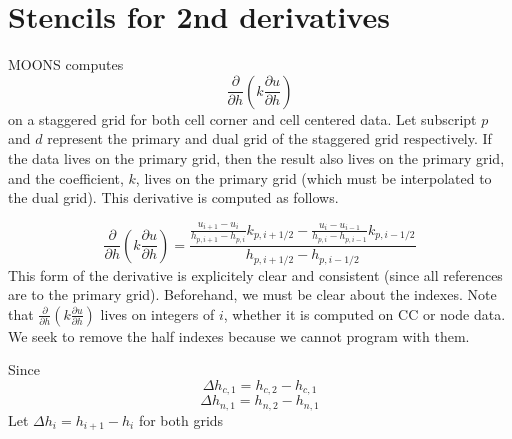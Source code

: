 \documentclass[11pt]{article}
\begin{document}
\section{Stencils for 2nd derivatives}
MOONS computes
\begin{equation}
\frac{\partial}{\partial h} \left( k \frac{\partial u}{\partial h} \right)
\end{equation}
on a staggered grid for both cell corner and cell centered data. Let subscript $p$ and $d$ represent the primary and dual grid of the staggered grid respectively. If the data lives on the primary grid, then the result also lives on the primary grid, and the coefficient, $k$, lives on the primary grid (which must be interpolated to the dual grid). This derivative is computed as follows.

\begin{equation}
\frac{\partial}{\partial h} \left( k \frac{\partial u}{\partial h} \right)
 = \frac{\frac{u_{i+1}-u_{i}}{h_{p,i+1}-h_{p,i}} k_{p,i+1/2} - \frac{u_{i}-u_{i-1}}{h_{p,i}-h_{p,i-1}} k_{p,i-1/2}}{h_{p,i+1/2} - h_{p,i-1/2}}
\end{equation}
This form of the derivative is explicitely clear and consistent (since all references are to the primary grid). Beforehand, we must be clear about the indexes. Note that $\frac{\partial}{\partial h} \left( k \frac{\partial u}{\partial h} \right)$ lives on integers of $i$, whether it is computed on CC or node data. We seek to remove the half indexes because we cannot program with them.

Since
\begin{equation}
  \Delta h_{c,1} = h_{c,2} - h_{c,1}
\end{equation}
\begin{equation}
  \Delta h_{n,1} = h_{n,2} - h_{n,1}
\end{equation}
Let $\Delta h_i = h_{i+1} - h_i$ for both grids
\end{document}
